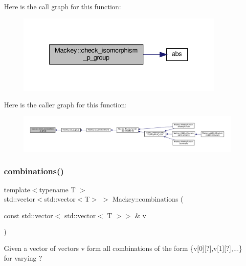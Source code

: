 Here is the call graph for this function\+:\nopagebreak
\begin{figure}[H]
\begin{center}
\leavevmode
\includegraphics[width=292pt]{namespaceMackey_aa96cf972d89b207ce6709e867f760f37_cgraph}
\end{center}
\end{figure}
Here is the caller graph for this function\+:\nopagebreak
\begin{figure}[H]
\begin{center}
\leavevmode
\includegraphics[width=350pt]{namespaceMackey_aa96cf972d89b207ce6709e867f760f37_icgraph}
\end{center}
\end{figure}
\mbox{\label{namespaceMackey_a3a4b7761ed7274b145eed9a451b53e61}} 
\subsubsection{\texorpdfstring{combinations()}{combinations()}}
{\footnotesize\ttfamily template$<$typename T $>$ \\
std\+::vector$<$std\+::vector$<$T$>$ $>$ Mackey\+::combinations (\begin{DoxyParamCaption}\item[{const std\+::vector$<$ std\+::vector$<$ T $>$$>$ \&}]{v }\end{DoxyParamCaption})}



Given a vector of vectors v form all combinations of the form \{v\mbox{[}0\mbox{]}\mbox{[}?\mbox{]},v\mbox{[}1\mbox{]}\mbox{[}?\mbox{]},...\} for varying ? 

